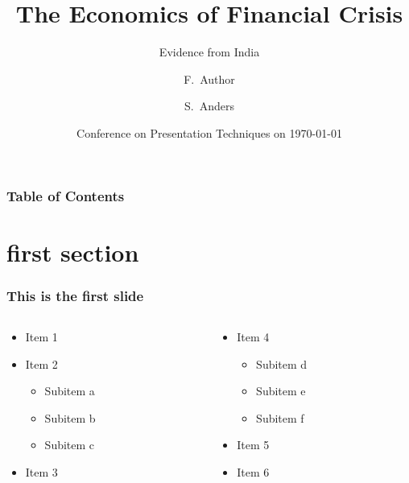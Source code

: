 \documentclass[aspectratio=169,ngerman]{beamer}
\title[Crisis] %
{The Economics of Financial Crisis}
\subtitle{Evidence from India}
\author[Author, Anders] %
{F.~Author\inst{1} \and S.~Anders\inst{2}}
\institute[Universities Here and There] %
{
  \inst{1}%
  Institute of Computer Science\\
  University Here
  \and
  \inst{2}%
  Institute of Theoretical Philosophy\\
  University There
}
\date[KPT 2004] %
{Conference on Presentation Techniques on \today}
\begin{document}
  \frame{\titlepage}

    \begin{frame}
        \frametitle{Table of Contents}
        \tableofcontents
    \end{frame}

\section{first section}

  \begin{frame}
    \frametitle{This is the first slide}
        \begin{columns}[c]
            \begin{column}{.5\textwidth}
                \begin{itemize}
                    \item Item 1
                    \item Item 2
                    \begin{itemize}
                        \item Subitem a
                        \item Subitem b
                        \item Subitem c
                    \end{itemize}
                    \item Item 3
                \end{itemize}
            \end{column}
            \begin{column}{.5\textwidth}
                \begin{itemize}
                    \item Item 4
                    \begin{itemize}
                        \item Subitem d
                        \item Subitem e
                        \item Subitem f
                    \end{itemize}
                    \item Item 5
                    \item Item 6
                \end{itemize}
            \end{column}
        \end{columns}
  \end{frame}
\end{document}
